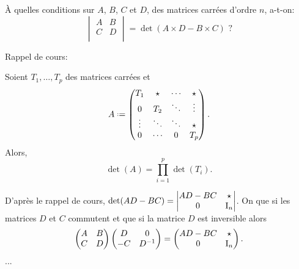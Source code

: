 \begin{exercice} 
À quelles conditions sur $A$, $B$, $C$ et $D$, des matrices carrées d'ordre $n$, a-t-on:
    $$
        \begin{vmatrix}
            A & B\\
            C & D\\
        \end{vmatrix} = \det(A \times D - B \times C) \text{ ?}
    $$ 
\end{exercice}
 
Rappel de cours:

\begin{prop}{}
    Soient $T_1, \dots, T_p$ des matrices carrées et 
    $$A \defeq
    \begin{pmatrix}
        T_1 & \star & \cdots & \star \\
        0 & T_2 & \ddots & \vdots \\
        \vdots & \ddots & \ddots & \star \\
        0 & \cdots & 0 & T_p
    \end{pmatrix}.
    $$
    Alors, 
    $$\det(A) = \prod_{i=1}^p \det(T_i).$$
\end{prop}

\begin{solution}
    D'après le rappel de cours, $\det(AD - BC) = \begin{vmatrix}
        AD - BC & \star \\
        0 & \mathrm{I}_n
    \end{vmatrix}$.  
    On  que si les matrices $D$ et $C$ commutent et que si la matrice $D$ est inversible alors
    $$
    \begin{pmatrix}
        A & B \\
        C & D
    \end{pmatrix}
    \begin{pmatrix}
        D & 0 \\
        -C & D^{-1}
    \end{pmatrix}
     = \begin{pmatrix}
         AD-BC & \star \\
         0 & \mathrm{I}_n
     \end{pmatrix}.
    $$
    ...
\end{solution}